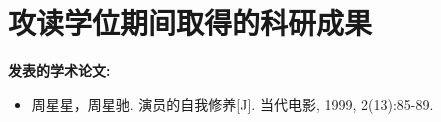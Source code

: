 \clearpage
{}
{}
\chapter*{攻读学位期间取得的科研成果}

\noindent \textbf{发表的学术论文:}
\begin{itemize}
    \item 周星星，周星驰. 演员的自我修养[J]. 当代电影, 1999, 2(13):85-89.
\end{itemize}
